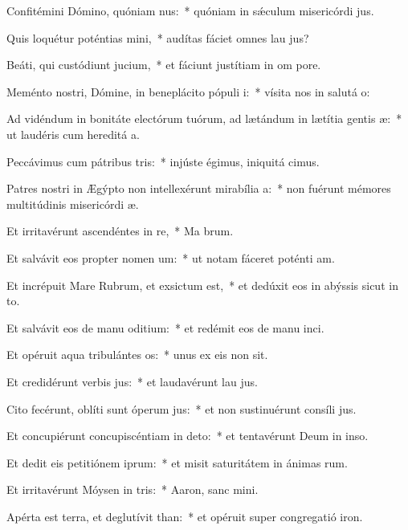 \item Confitémini Dómino, quóniam nus:~* quóniam in sǽculum misericórdi jus.
\item Quis loquétur poténtias mini,~* audítas fáciet omnes lau jus?
\item Beáti, qui custódiunt jucium,~* et fáciunt justítiam in om pore.
\item Meménto nostri, Dómine, in beneplácito pópuli i:~* vísita nos in salutá o:
\item Ad vidéndum in bonitáte electórum tuórum, ad lætándum in lætítia gentis æ:~* ut laudéris cum hereditá a.
\item Peccávimus cum pátribus tris:~* injúste égimus, iniquitá cimus.
\item Patres nostri in Ægýpto non intellexérunt mirabília a:~* non fuérunt mémores multitúdinis misericórdi æ.
\item Et irritavérunt ascendéntes in re,~* Ma brum.
\item Et salvávit eos propter nomen um:~* ut notam fáceret poténti am.
\item Et incrépuit Mare Rubrum, et exsictum est,~* et dedúxit eos in abýssis sicut in to.
\item Et salvávit eos de manu oditium:~* et redémit eos de manu inci.
\item Et opéruit aqua tribulántes os:~* unus ex eis non sit.
\item Et credidérunt verbis jus:~* et laudavérunt lau jus.
\item Cito fecérunt, oblíti sunt óperum jus:~* et non sustinuérunt consíli jus.
\item Et concupiérunt concupiscéntiam in deto:~* et tentavérunt Deum in inso.
\item Et dedit eis petitiónem iprum:~* et misit saturitátem in ánimas rum.
\item Et irritavérunt Móysen in tris:~* Aaron, sanc mini.
\item Apérta est terra, et deglutívit than:~* et opéruit super congregatió iron.
